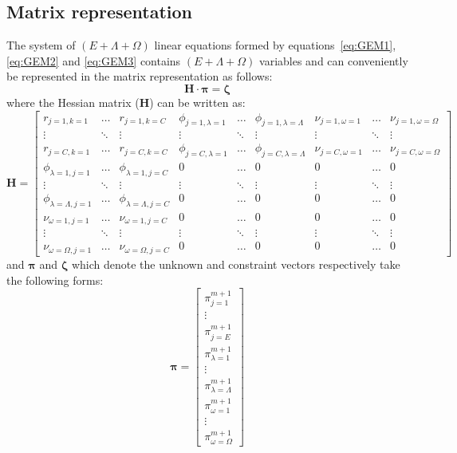	\subsection{Matrix representation}
	The system of $(E+\Lambda+\Omega)$ linear equations formed by equations~\eqref{eq:GEM1}, \eqref{eq:GEM2} and \eqref{eq:GEM3} contains $(E+\Lambda+\Omega)$ variables and can conveniently be represented in the matrix representation as follows:
	\begin{equation}\label{eq:GEM_mat}
		\mathbf{H}\cdot\boldsymbol{\pi} = \boldsymbol{\zeta}
	\end{equation}
	where the Hessian matrix ($\mathbf{H}$) can be written as:
	\begin{equation}\label{eq:Hessian_mat}
        \mathbf{H} =
        \begin{bmatrix}
            r_{j=1,k=1} & \dots & r_{j=1,k=C} & \phi_{j=1,\lambda=1} & \dots & \phi_{j=1,\lambda=\Lambda} & \nu_{j=1,\omega=1} & \dots & \nu_{j=1,\omega=\Omega} \\
            \vdots & \ddots & \vdots & \vdots & \ddots & \vdots & \vdots & \ddots & \vdots \\
            r_{j=C,k=1} & \dots & r_{j=C,k=C} & \phi_{j=C,\lambda=1} & \dots & \phi_{j=C,\lambda=\Lambda} & \nu_{j=C,\omega=1} & \dots & \nu_{j=C,\omega=\Omega} \\
            \phi_{\lambda=1,j=1} & \dots & \phi_{\lambda=1,j=C} & 0 & \dots & 0 & 0 & \dots & 0 \\
            \vdots & \ddots & \vdots & \vdots & \ddots & \vdots & \vdots & \ddots & \vdots \\
            \phi_{\lambda=\Lambda,j=1} & \dots & \phi_{\lambda=\Lambda,j=C} & 0 & \dots & 0 & 0 & \dots & 0 \\
            \nu_{\omega=1,j=1} & \dots & \nu_{\omega=1,j=C} & 0 & \dots & 0 & 0 & \dots & 0 \\
            \vdots & \ddots & \vdots & \vdots & \ddots & \vdots & \vdots & \ddots & \vdots \\
            \nu_{\omega=\Omega,j=1} & \dots & \nu_{\omega=\Omega,j=C} & 0 & \dots & 0 & 0 & \dots & 0
        \end{bmatrix}
    \end{equation}
    and $\boldsymbol{\pi}$ and $\boldsymbol{\zeta}$ which denote the unknown and constraint vectors respectively take the following forms:
    \begin{equation}\label{eq:LagMult_mat}
        \boldsymbol{\pi} =
        \begin{bmatrix}
            \pi_{j=1}^{m+1} \\
            \vdots \\
            \pi_{j=E}^{m+1} \\
            \pi_{\lambda=1}^{m+1} \\
            \vdots \\
            \pi_{\lambda=\Lambda}^{m+1} \\
            \pi_{\omega=1}^{m+1} \\
            \vdots\\
            \pi_{\omega=\Omega}^{m+1}
        \end{bmatrix}
    \end{equation}

